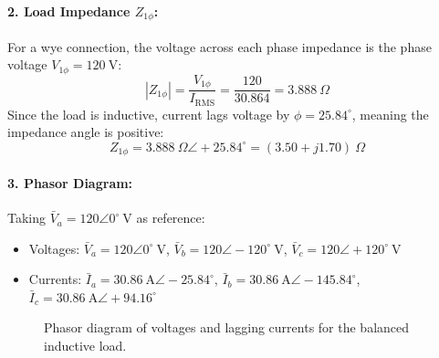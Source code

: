 \paragraph{2. Load Impedance $Z_{1\phi}$:}
For a wye connection, the voltage across each phase impedance is the phase voltage $V_{1\phi} = 120\ \text{V}$:
\begin{equation}
    |Z_{1\phi}| = \frac{V_{1\phi}}{I_{\text{RMS}}} = \frac{120}{30.864} = 3.888\ \Omega
\end{equation}
Since the load is inductive, current lags voltage by $\phi = 25.84^\circ$, meaning the impedance angle is positive:
\begin{equation}
    \boxed{Z_{1\phi} = 3.888\ \Omega \angle +25.84^\circ = (3.50 + j1.70)\ \Omega}
\end{equation}

\paragraph{3. Phasor Diagram:}
Taking $\bar{V}_a = 120\angle 0^\circ\ \text{V}$ as reference:
\begin{itemize}
    \item Voltages: $\bar{V}_a = 120\angle 0^\circ\ \text{V}$, $\bar{V}_b = 120\angle -120^\circ\ \text{V}$, $\bar{V}_c = 120\angle +120^\circ\ \text{V}$
    \item Currents: $\bar{I}_a = 30.86\ \text{A} \angle -25.84^\circ$, $\bar{I}_b = 30.86\ \text{A} \angle -145.84^\circ$, $\bar{I}_c = 30.86\ \text{A} \angle +94.16^\circ$
\end{itemize}

\begin{figure}[htbp]
    \centering
    \caption{Phasor diagram of voltages and lagging currents for the balanced inductive load.}
    \label{fig:tp2_phasor2}
\end{figure}

